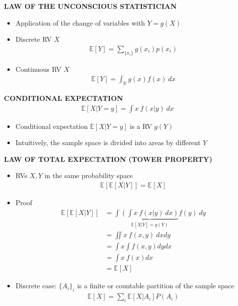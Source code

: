 \begin{whitebox}{\textbf{LAW OF THE UNCONSCIOUS STATISTICIAN}}
    \begin{itemize}
        \item Application of the change of variables with $Y=g(X)$
        \item Discrete RV $X$
        \begin{align*}
            \mathbb{E}[Y]=\sum_{\{x_i\}}g(x_i)p(x_i)
        \end{align*}
        \item Continuous RV $X$
        \begin{align*}
            \mathbb{E}[Y]=\int_\mathbb{R}g(x)f(x)\ dx
        \end{align*}
    \end{itemize}
\end{whitebox}

\begin{whitebox}{\textbf{CONDITIONAL EXPECTATION}}
    \begin{align*}
        \mathbb{E}[X|Y=y]=\int x\ f(x|y)\ dx
    \end{align*}
    \begin{itemize}
        \item Conditional expectation $\mathbb{E}[X|Y=y]$ is a RV $g(Y)$
        \item Intuitively, the sample space is divided into areas by different $Y$

    \end{itemize}
\end{whitebox}

\begin{whitebox}{\textbf{LAW OF TOTAL EXPECTATION (TOWER PROPERTY)}}
    \begin{itemize}
        \item RVs $X,Y$ in the same probability space
        \begin{align*}
            \mathbb{E}\left[\mathbb{E}[X|Y]\right]=\mathbb{E}[X]
        \end{align*}
        \item Proof
        \begin{align*}
            \mathbb{E}\left[\mathbb{E}[X|Y]\right]&=\int\underbrace{\left(\int x\ f(x|y)\ dx\right)}_{\mathbb{E}[X|Y]=g(Y)}f(y)\ dy\\
            &=\iint x\ f(x,y)\ dxdy\\
            &=\int x\int f(x,y)dydx\\
            &=\int x\ f(x) dx\\
            &=\mathbb{E}[X]
        \end{align*}
        \item Discrete case: $\{A_i\}_i$ is a finite or countable partition of the sample space
        \begin{align*}
            \mathbb{E}[X]=\sum_i\mathbb{E}[X|A_i]P(A_i)
        \end{align*}
    \end{itemize}
\end{whitebox}

